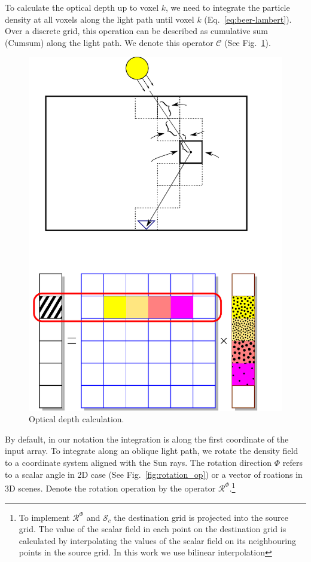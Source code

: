 \documentclass[10pt,twocolumn,letterpaper]{article}
\newcommand{\OpSphere}{\bm{\mathcal{S}}}
\newcommand{\OpRot}{\bm{\mathcal{R}}}
\newcommand{\OpCumsum}{\bm{\mathcal{C}}}
\begin{document}
To calculate the optical depth up to voxel $k$, we need to integrate
the particle density at all voxels along the light path until voxel
$k$ (Eq.~\ref{eq:beer-lambert}).  Over a discrete grid, this operation
can be described as cumulative sum (Cumsum) along the light path.  We
denote this operator $\OpCumsum$ (See Fig.~\ref{fig:cumsum_op}).
\begin{figure}
  \centering
    \includegraphics[width=\columnwidth]{images/optical_distance.pdf}
    \caption{Optical depth calculation.}
  \label{fig:cumsum_op}
\end{figure}
By default, in our notation the integration is along the first
coordinate of the input array. To integrate along an oblique light
path, we rotate the density field to a coordinate system aligned with
the Sun rays.  The rotation direction $\Phi$ refers to a scalar angle
in 2D case (See Fig.~\ref{fig:rotation_op}) or a vector of roations in
3D scenes. Denote the rotation operation by the operator
$\OpRot^{\Phi}$.\footnote{To implement $\OpRot^{\Phi}$ and
  $\OpSphere_c$ the destination grid is projected into the source
  grid. The value of the scalar field in each point on the destination
  grid is calculated by interpolating the values of the scalar field
  on its neighbouring points in the source grid. In this work we use
  bilinear interpolation}
\end{document}

